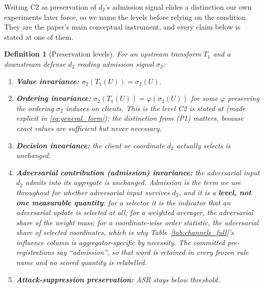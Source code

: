 \documentclass{article}
\newtheorem{definition}{Definition}
\begin{document}
Writing C2 as preservation of $d_2$'s admission signal elides a distinction our own experiments later force, so we name the levels before relying on the condition. They are the paper's main conceptual instrument, and every claim below is stated at one of them.

\begin{definition}[Preservation levels]
\label{def:levels_full}
For an upstream transform $T_1$ and a downstream defense $d_2$ reading admission signal $\sigma_2$:
\begin{enumerate}[noitemsep,topsep=2pt,label=(P\arabic*)]
\item \textbf{Value invariance:} $\sigma_2(T_1(U)) = \sigma_2(U)$.
\item \textbf{Ordering invariance:} $\sigma_2(T_1(U)) = \varphi(\sigma_2(U))$ for some $\varphi$ preserving the ordering $\sigma_2$ induces on clients. \emph{This is the level C2 is stated at} (made explicit in \eqref{eq:general_form}); the distinction from (P1) matters, because exact values are sufficient but never necessary.
\item \textbf{Decision invariance:} the client or coordinate $d_2$ actually selects is unchanged.
\item \textbf{Adversarial contribution (admission) invariance:} the \emph{adversarial} input $d_2$ admits into its aggregate is unchanged. \emph{Admission} is the term we use throughout for whether adversarial input survives $d_2$, and it is a \textbf{level, not one measurable quantity}: for a selector it is the indicator that an adversarial update is selected at all; for a weighted averager, the adversarial share of the weight mass; for a coordinate-wise order statistic, the adversarial share of selected coordinates, which is why Table~\ref{tab:channels_full}'s influence column is aggregator-specific by necessity. The committed pre-registrations say ``admission'', so that word is retained in every frozen rule name and no scored quantity is relabelled.
\item \textbf{Attack-suppression preservation:} ASR stays below threshold.
\end{enumerate}

\end{definition}
\end{document}
